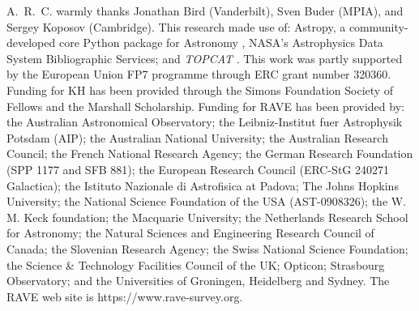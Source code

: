 \documentclass[preprint,trackchanges]{aastex}
\newcommand{\project}[1]{\textsl{#1}}
\begin{document}
    



\acknowledgements
A.~R.~C. warmly thanks Jonathan Bird (Vanderbilt), Sven Buder (MPIA), and
Sergey Koposov (Cambridge).
This research made use of: Astropy, a community-developed core Python package for
Astronomy \citep{astropy}, NASA's Astrophysics Data System Bibliographic Services;
and \project{TOPCAT} \citep{Taylor_2005}.
This work was partly supported by the European Union FP7 programme through ERC 
grant number 320360. Funding for KH has been provided through the Simons Foundation Society of Fellows and the Marshall Scholarship.
Funding for RAVE has been provided by: the Australian Astronomical Observatory; 
the Leibniz-Institut fuer Astrophysik Potsdam (AIP); the Australian National 
University; the Australian Research Council; the French National Research Agency;
the German Research Foundation (SPP 1177 and SFB 881); the European Research 
Council (ERC-StG 240271 Galactica); the Istituto Nazionale di Astrofisica at 
Padova; The Johns Hopkins University; the National Science Foundation of the USA
(AST-0908326); the W. M. Keck foundation; the Macquarie University; the 
Netherlands Research School for Astronomy; the Natural Sciences and Engineering 
Research Council of Canada; the Slovenian Research Agency; the Swiss National 
Science Foundation; the Science \& Technology Facilities Council of the UK; 
Opticon; Strasbourg Observatory; and the Universities of Groningen, Heidelberg 
and Sydney. The RAVE web site is https://www.rave-survey.org.  
\end{document}
